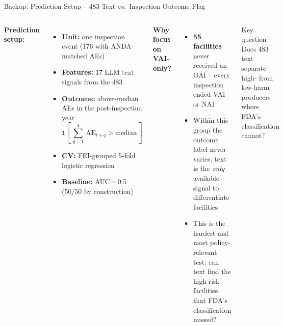 \documentclass[aspectratio=169,10pt]{beamer}
\newcommand{\highlight}[1]{{\color{ncsuRed}\textbf{#1}}}
\begin{document}
\begin{frame}{Backup: Prediction Setup -- 483 Text vs.\ Inspection Outcome Flag}
\begin{columns}[T]
\textbf{Prediction setup:}

\vspace{4pt}
{\small
\begin{itemize}
  \setlength{\itemsep}{5pt}
  \item \textbf{Unit:} one inspection event (176 with ANDA-matched AEs)
  \item \textbf{Features:} 17 LLM text signals from the 483
  \item \textbf{Outcome:} above-median AEs in the post-inspection year
        $$\mathbf{1}\!\left[\,\textstyle\sum_{q=1}^{4}\,\text{AE}_{t+q} > \text{median}\,\right]$$
  \item \textbf{CV:} FEI-grouped 5-fold logistic regression
  \item \textbf{Baseline:} AUC\,=\,0.5 (50/50 by construction)
\end{itemize}
}

\textbf{Why focus on VAI-only?}

\vspace{6pt}
\begin{itemize}
  \setlength{\itemsep}{8pt}
  \item \highlight{55 facilities} never received an OAI -- every inspection ended VAI or NAI
  \item Within this group the outcome label never varies; text is the \emph{only} available signal to differentiate facilities
  \item This is the hardest and most policy-relevant test: can text find the high-risk facilities that FDA's classification missed?
\end{itemize}

\vspace{8pt}
\begin{alertblock}{Key question}
\small Does 483 text separate high- from low-harm producers where FDA's classification cannot?
\end{alertblock}
\end{columns}
\end{frame}
\end{document}
